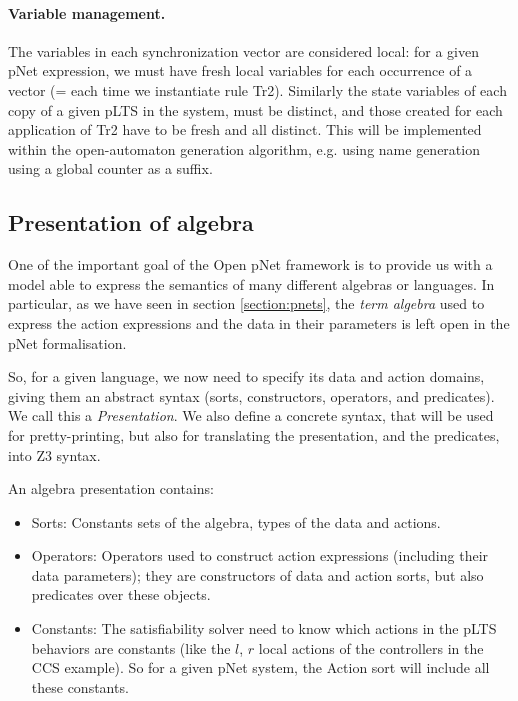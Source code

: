 \documentclass{lncs/llncs}
\begin{document}
    


\paragraph{Variable management.}
The variables in each synchronization vector are considered local:
for a given pNet expression, we must have fresh local variables for
each occurrence of a vector (= each time we instantiate rule
Tr2). Similarly the state variables of each copy of a
given pLTS in the system, must be distinct, and those created for each
application of Tr2 have to be fresh and all distinct. 
This will be implemented within the open-automaton generation algorithm,
e.g. using name generation using a global counter as a suffix.


\subsection{Presentation of algebra}
One of the important goal of the Open pNet framework is to provide us
with a model able to express the semantics of many different algebras
or languages. In particular, as we have seen in section
\ref{section:pnets}, the \emph{term algebra} used to express the
action expressions and the data in their parameters is left open in
the pNet formalisation.

So, for a given language, we now need to specify its data and action
domains, giving them an abstract syntax (sorts, constructors, operators,
and predicates). We call this a \emph{Presentation}.
We also define a concrete syntax, that will be used for
pretty-printing, but also for translating the presentation, and the
predicates, into Z3 syntax. 

An algebra presentation contains:
\begin{itemize}
	\item Sorts: Constants sets of the algebra, types of the data
          and actions. 
	\item Operators: Operators used to construct action
          expressions (including their data parameters); they are
          constructors of data and action sorts, but also predicates
          over these objects.
        \item Constants: The satisfiability solver need to know which
          actions in the pLTS behaviors are constants (like the $l$,
          $r$ local actions of the controllers in the CCS example). So
          for a given pNet system, the Action sort will include all
          these constants.
\end{itemize}
\end{document}
